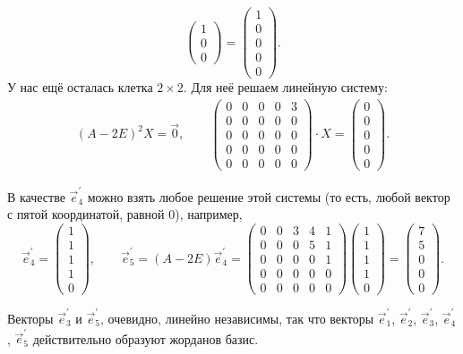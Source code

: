 \begin{solution}
\[\begin{pmatrix}
			1\\
			0\\
			0
		\end{pmatrix} =
		\begin{pmatrix}
			1\\
			0\\
			0\\
			0\\
			0
		\end{pmatrix}.
	\]
	У нас ещё осталась клетка $2 \times 2$. Для неё решаем линейную систему:
	\begin{gather*}
		(A - 2E)^2X = \vec{0},\qquad
		\begin{pmatrix}
			0 & 0 & 0 & 0 & 3\\
			0 & 0 & 0 & 0 & 0\\
			0 & 0 & 0 & 0 & 0\\
			0 & 0 & 0 & 0 & 0\\
			0 & 0 & 0 & 0 & 0
		\end{pmatrix} \cdot X =
		\begin{pmatrix}
			0\\
			0\\
			0\\
			0\\
			0
		\end{pmatrix}.
	\end{gather*}

	В качестве $\vec{e}^\prime_4$ можно взять любое решение этой системы (то есть, любой вектор с пятой координатой, равной $0$), например,
	\[
		\vec{e}^\prime_4 =
		\begin{pmatrix}
			1\\
			1\\
			1\\
			1\\
			0
		\end{pmatrix},\qquad
		\vec{e}^\prime_5 = (A - 2E)\vec{e}^\prime_4 =
		\begin{pmatrix}
			0 & 0 & 3 & 4 & 1\\
			0 & 0 & 0 & 5 & 1\\
			0 & 0 & 0 & 0 & 1\\
			0 & 0 & 0 & 0 & 0\\
			0 & 0 & 0 & 0 & 0
		\end{pmatrix}
		\begin{pmatrix}
			1\\
			1\\
			1\\
			1\\
			0
		\end{pmatrix} =
		\begin{pmatrix}
			7\\
			5\\
			0\\
			0\\
			0
		\end{pmatrix}.
	\]

	Векторы $\vec{e}^\prime_3$ и $\vec{e}^\prime_5$, очевидно, линейно независимы, так что векторы $\vec{e}^\prime_1$, $\vec{e}^\prime_2$, $\vec{e}^\prime_3$, $\vec{e}^\prime_4$, $\vec{e}^\prime_5$ действительно образуют жорданов базис.
\end{solution}

